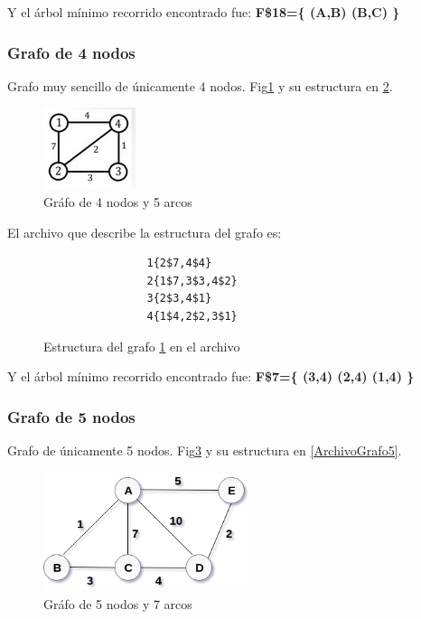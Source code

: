        Y el árbol mínimo recorrido encontrado fue: \textbf{F\$18=\{ (A,B)  (B,C) \}}
        
        \subsubsection*{Grafo de 4 nodos}
        Grafo muy sencillo de únicamente 4 nodos. Fig\ref{Grafo4} y su estructura en \ref{ArchivoGrafo4}.
        
        \begin{figure}[h!]
            \centering
            \includegraphics{Kruskal/Grafo4.png}
            \caption{Gráfo de 4 nodos y 5 arcos}
            \label{Grafo4}
        \end{figure}
            
        El archivo que describe la estructura del grafo es:
        \begin{figure}[h!]
            \centering
            \begin{verbatim}
                1{2$7,4$4}
                2{1$7,3$3,4$2}
                3{2$3,4$1}
                4{1$4,2$2,3$1} \end{verbatim}
            \caption{Estructura del grafo \ref{Grafo4} en el archivo}
            \label{ArchivoGrafo4}
        \end{figure} 
        
        Y el árbol mínimo recorrido encontrado fue: \textbf{F\$7=\{ (3,4)  (2,4)  (1,4) \}}
        
        \subsubsection*{Grafo de 5 nodos}
        Grafo de únicamente 5 nodos. Fig\ref{Grafo5} y su estructura en \ref{ArchivoGrafo5}.
        
        \begin{figure}[h!]
            \centering
            \includegraphics[width=6cm]{Kruskal/Grafo5.png}
            \caption{Gráfo de 5 nodos y 7 arcos}
            \label{Grafo5}
        \end{figure}
            
